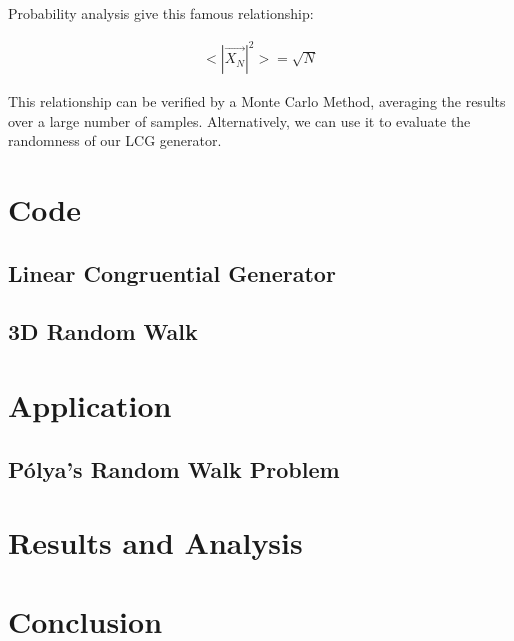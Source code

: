 \documentclass{article}
\begin{document}
Probability analysis give this famous relationship:

\begin{align*}
  <|\vec{X_N}|^2> = \sqrt{N} 
\end{align*}

This relationship can be verified by a Monte Carlo Method, averaging the results
over a large number of samples. Alternatively, we can use it to evaluate the 
randomness of our LCG generator.
\section{Code}

\subsection{Linear Congruential Generator}



\subsection{3D Random Walk}

\section{Application}

\subsection{P\'olya's Random Walk Problem}

\section{Results and Analysis}

\section{Conclusion}
\end{document}
